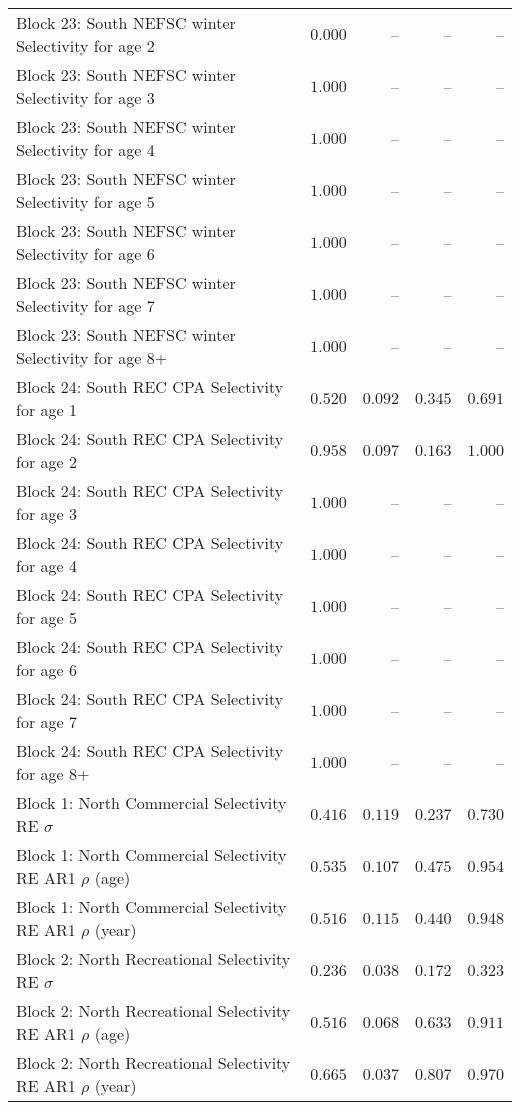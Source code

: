 \documentclass[
]{article}
\begin{document}
\begin{landscape}
\begin{longtable}[t]{lrrrr}
Block 23: South NEFSC winter Selectivity for age 2 & $0.000$ & -- & -- & --\\
\addlinespace
Block 23: South NEFSC winter Selectivity for age 3 & $1.000$ & -- & -- & --\\
Block 23: South NEFSC winter Selectivity for age 4 & $1.000$ & -- & -- & --\\
Block 23: South NEFSC winter Selectivity for age 5 & $1.000$ & -- & -- & --\\
Block 23: South NEFSC winter Selectivity for age 6 & $1.000$ & -- & -- & --\\
Block 23: South NEFSC winter Selectivity for age 7 & $1.000$ & -- & -- & --\\
\addlinespace
Block 23: South NEFSC winter Selectivity for age 8+ & $1.000$ & -- & -- & --\\
Block 24: South REC CPA Selectivity for age 1 & $0.520$ & $0.092$ & $0.345$ & $0.691$\\
Block 24: South REC CPA Selectivity for age 2 & $0.958$ & $0.097$ & $0.163$ & $1.000$\\
Block 24: South REC CPA Selectivity for age 3 & $1.000$ & -- & -- & --\\
Block 24: South REC CPA Selectivity for age 4 & $1.000$ & -- & -- & --\\
\addlinespace
Block 24: South REC CPA Selectivity for age 5 & $1.000$ & -- & -- & --\\
Block 24: South REC CPA Selectivity for age 6 & $1.000$ & -- & -- & --\\
Block 24: South REC CPA Selectivity for age 7 & $1.000$ & -- & -- & --\\
Block 24: South REC CPA Selectivity for age 8+ & $1.000$ & -- & -- & --\\
Block 1: North Commercial Selectivity RE $\sigma$ & $0.416$ & $0.119$ & $0.237$ & $0.730$\\
\addlinespace
Block 1: North Commercial Selectivity RE AR1 $\rho$ (age) & $0.535$ & $0.107$ & $0.475$ & $0.954$\\
Block 1: North Commercial Selectivity RE AR1 $\rho$ (year) & $0.516$ & $0.115$ & $0.440$ & $0.948$\\
Block 2: North Recreational Selectivity RE $\sigma$ & $0.236$ & $0.038$ & $0.172$ & $0.323$\\
Block 2: North Recreational Selectivity RE AR1 $\rho$ (age) & $0.516$ & $0.068$ & $0.633$ & $0.911$\\
Block 2: North Recreational Selectivity RE AR1 $\rho$ (year) & $0.665$ & $0.037$ & $0.807$ & $0.970$\\

\end{longtable}
\end{landscape}
\end{document}
